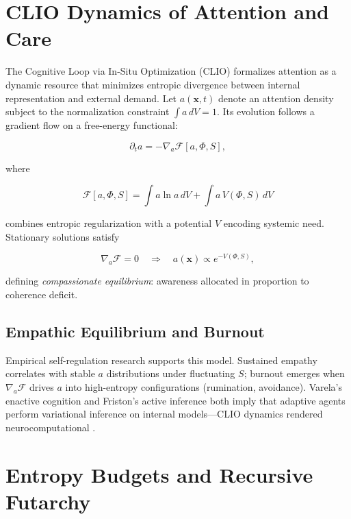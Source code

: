 \documentclass[12pt,a4paper]{article}
\begin{document}
\section{CLIO Dynamics of Attention and Care}

The Cognitive Loop via In-Situ Optimization (CLIO) formalizes attention as a dynamic resource that minimizes entropic divergence between internal representation and external demand. Let $a(\mathbf{x},t)$ denote an attention density subject to the normalization constraint $\int a \, dV = 1$. Its evolution follows a gradient flow on a free-energy functional:

\begin{equation}
\partial_t a = -\nabla_a \mathcal{F}[a,\Phi,S],
\end{equation}

where

\begin{equation}
\mathcal{F}[a,\Phi,S] = \int a \ln a \, dV + \int a \, V(\Phi,S) \, dV
\end{equation}

combines entropic regularization with a potential $V$ encoding systemic need. Stationary solutions satisfy

\begin{equation}
\nabla_a \mathcal{F} = 0 \quad \Rightarrow \quad a(\mathbf{x}) \propto e^{-V(\Phi,S)},
\end{equation}

defining \emph{compassionate equilibrium}: awareness allocated in proportion to coherence deficit.

\subsection{Empathic Equilibrium and Burnout}

Empirical self-regulation research supports this model. Sustained empathy correlates with stable $a$ distributions under fluctuating $S$; burnout emerges when $\nabla_a \mathcal{F}$ drives $a$ into high-entropy configurations (rumination, avoidance). Varela’s enactive cognition and Friston’s active inference both imply that adaptive agents perform variational inference on internal models—CLIO dynamics rendered neurocomputational \cite{varela1991embodied,friston2010free}.

\section{Entropy Budgets and Recursive Futarchy}
\end{document}
